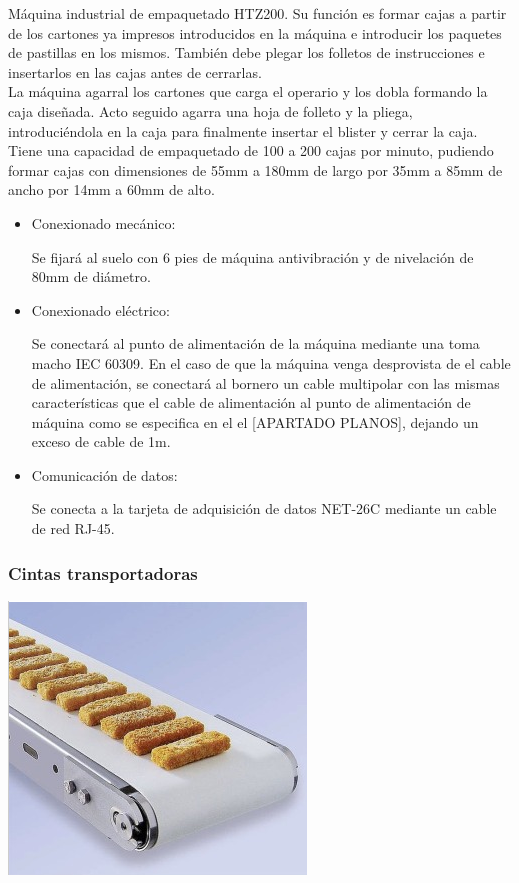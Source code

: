 	Máquina industrial de empaquetado HTZ200. Su función es formar cajas a partir de los cartones ya impresos introducidos en la máquina e introducir los paquetes de pastillas en los mismos. También debe plegar los folletos de instrucciones e insertarlos en las cajas antes de cerrarlas. \\

	La máquina agarral los cartones que carga el operario y los dobla formando la caja diseñada. Acto seguido agarra una hoja de folleto y la pliega, introduciéndola en la caja para finalmente insertar el blister y cerrar la caja.\\

	Tiene una capacidad de empaquetado de 100 a 200 cajas por minuto, pudiendo formar cajas con dimensiones de 55mm a 180mm de largo por 35mm a 85mm de ancho por 14mm a 60mm de alto.


		\begin{itemize}
				\item{Conexionado mecánico:}
				
				Se fijará al suelo con 6 pies de máquina antivibración y de nivelación de 80mm de diámetro.

				\item{Conexionado eléctrico:}

				Se conectará al punto de alimentación de la máquina mediante una  toma macho IEC 60309. En el caso de que la máquina venga desprovista de el cable de alimentación, se conectará al bornero un cable multipolar con las mismas características que el cable de alimentación al punto de alimentación de máquina como se especifica en el el [APARTADO PLANOS], dejando un exceso de cable de 1m. \
				
				\item{Comunicación de datos:}

				Se conecta a la tarjeta de adquisición de datos NET-26C mediante un cable de red RJ-45.
		\end{itemize}

\newpage


	\subsubsection{Cintas transportadoras}

	\includegraphics[scale=0.5]{Datasheets/11Foto.png}
	\\

